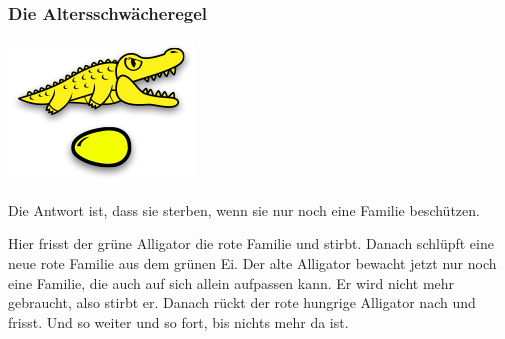 \documentclass{beamer}
\begin{document}

\begin{frame}
\frametitle{Die Altersschwächeregel}

\begin{center}
\includegraphics[scale=0.35]{old_5.png} 
\end{center}

Die Antwort ist, dass sie sterben, wenn sie nur noch eine Familie beschützen.\bigskip

Hier frisst der grüne Alligator die rote Familie und stirbt. Danach schlüpft eine neue rote Familie aus dem grünen Ei. Der alte Alligator bewacht jetzt nur noch eine Familie, die auch auf sich allein aufpassen kann. Er wird nicht mehr gebraucht, also stirbt er.
Danach rückt der rote hungrige Alligator nach und frisst. Und so weiter und so fort, bis nichts mehr da ist.

\end{frame}

\end{document}
